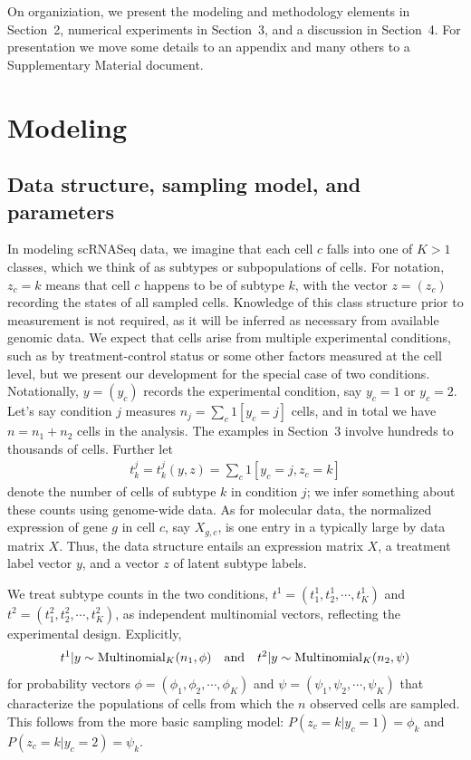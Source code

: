 \documentclass[aoas,preprint]{imsart}
\begin{document}
On organiziation, we present
the modeling and methodology elements in Section~2, numerical experiments in Section~3, and a discussion
in Section~4.  For presentation we move some details to an appendix and many others to a Supplementary 
Material document.



\section{Modeling}
\subsection{Data structure, sampling model, and parameters}

In modeling scRNASeq data, we
imagine that each cell $c$ falls into one of $K>1$ classes, which we think of as
subtypes or subpopulations of cells. For notation, $z_c=k$ means that cell $c$ happens to be of subtype $k$, with the vector $z=(z_c)$ recording
the states of all sampled cells.  Knowledge of this class structure
 prior to measurement is not required, as it will be inferred as necessary from
 available genomic data.   We expect that cells arise from multiple
experimental conditions, such as by treatment-control status or some other factors
 measured at the cell level, but we present our development for the special
case of two conditions.  Notationally, $y=(y_c)$ records the experimental condition, say $y_c=1$ or $y_c=2$.
 Let's say condition $j$ measures $n_j=\sum_{c} 1[y_c=j]$ cells,  and
in total we have $n=n_1+n_2$ cells in the analysis.  The examples in Section~3 involve hundreds to thousands of cells.
Further let \begin{eqnarray}
\label{eq:counts}
t^j_k = t^j_k(y,z) = \sum_c 1[y_c=j, z_c=k] 
\end{eqnarray}
denote the number of cells of subtype $k$ in condition $j$;
we infer something about these counts using genome-wide data.  As for molecular data, the 
normalized expression of gene $g$ in cell $c$, say $X_{g,c}$, is one entry
in a typically large {} by {} data matrix $X$.  Thus, the data structure entails an expression matrix
$X$, a treatment label vector $y$, and a vector $z$ of latent subtype labels.


We treat subtype counts in the two conditions,  $t^1 = (t^1_1, t^1_2, \cdots, t^1_K )$ and 
$t^2 = (t^2_1, t^2_2, \cdots, t^2_K)$,  as independent multinomial
vectors, reflecting the experimental design.  Explicitly,
\begin{eqnarray}
\label{eq:mult}
t^1| y \sim \text{Multinomial}_K( n_1, \phi ) \quad {\mbox {\rm and}} \quad
t^2| y \sim \text{Multinomial}_K( n_2, \psi )
\end{eqnarray}
for probability vectors 
$\phi = (\phi_1, \phi_2, \cdots, \phi_K)$ and 
 $\psi = ( \psi_1, \psi_2, \cdots, \psi_K)$ that characterize the populations of
cells from which the $n$ observed cells are sampled.  This follows from the more basic 
sampling model:
$P(z_c=k|y_c=1) = \phi_k$ and $P(z_c=k| y_c =2 ) = \psi_k.$
\end{document}

